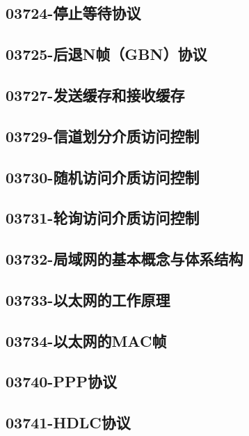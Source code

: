 \subsection{03724-停止等待协议}

\subsection{03725-后退N帧（GBN）协议}

\subsection{03727-发送缓存和接收缓存}

\subsection{03729-信道划分介质访问控制}

\subsection{03730-随机访问介质访问控制}

\subsection{03731-轮询访问介质访问控制}

\subsection{03732-局域网的基本概念与体系结构}

\subsection{03733-以太网的工作原理}

\subsection{03734-以太网的MAC帧}

\subsection{03740-PPP协议}

\subsection{03741-HDLC协议}

